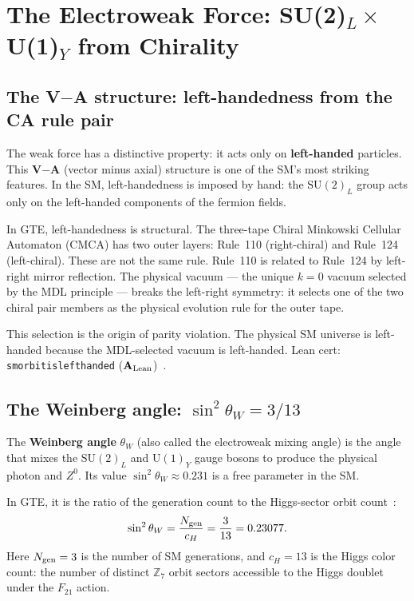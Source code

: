 \documentclass[11pt,a4paper]{article}
\newcommand{\term}[1]{\textbf{#1}}
\newcommand{\lean}[1]{%
  \penalty-100
  \begingroup\def\_{\textunderscore\allowbreak}\texttt{#1}\endgroup}
\newcommand{\CatAL}{\ensuremath{\mathbf{A}_{\rm Lean}}}
\newcommand{\Ngen}{N_{\rm gen}}
\newcommand{\cH}{c_H}
\begin{document}
\section{The Electroweak Force: SU(2)$_L \times$ U(1)$_Y$ from Chirality}
\label{sec:ew}

\subsection{The V$-$A structure: left-handedness from the CA rule pair}

The weak force has a distinctive property: it acts only on \term{left-handed}
particles.
This \term{V$-$A} (vector minus axial) structure is one of the SM's most striking
features.
In the SM, left-handedness is imposed by hand: the $\mathrm{SU}(2)_L$ group
acts only on the left-handed components of the fermion fields.

In GTE, left-handedness is structural.
The three-tape Chiral Minkowski Cellular Automaton (CMCA) has two outer layers:
Rule~110 (right-chiral) and Rule~124 (left-chiral).
These are not the same rule.
Rule~110 is related to Rule~124 by left-right mirror reflection.
The physical vacuum --- the unique $k = 0$ vacuum selected by the MDL principle
--- breaks the left-right symmetry: it selects one of the two chiral pair members
as the physical evolution rule for the outer tape.

This selection is the origin of parity violation.
The physical SM universe is left-handed because the MDL-selected vacuum
is left-handed.
Lean cert: \lean{sm\_orbit\_is\_left\_handed} (\CatAL)~\cite{SpivackGTECompleteFramework}.

\subsection{The Weinberg angle: $\sin^2\theta_W = 3/13$}

The \term{Weinberg angle} $\theta_W$ (also called the electroweak mixing angle)
is the angle that mixes the $\mathrm{SU}(2)_L$ and $\mathrm{U}(1)_Y$ gauge
bosons to produce the physical photon and $Z^0$.
Its value $\sin^2\theta_W \approx 0.231$ is a free parameter in the SM.

In GTE, it is the ratio of the generation count to the Higgs-sector orbit count~\cite{SpivackWeinbergAngle}:
\begin{equation}
  \sin^2\theta_W = \frac{\Ngen}{\cH} = \frac{3}{13} = 0.23077.
  \label{eq:weinberg}
\end{equation}
Here $\Ngen = 3$ is the number of SM generations, and $\cH = 13$ is the
Higgs color count: the number of distinct $\mathbb{Z}_7$ orbit sectors
accessible to the Higgs doublet under the $F_{21}$ action.
\end{document}
